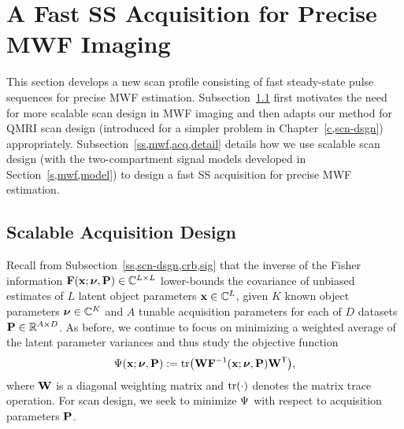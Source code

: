 \section{A Fast SS Acquisition for Precise MWF Imaging}
\label{s,mwf,acq}

This section develops a new scan profile
consisting of fast steady-state pulse sequences
for precise MWF estimation.
Subsection~\ref{ss,mwf,acq,design} 
first motivates the need
for more scalable scan design
in MWF imaging 
and then adapts our method 
for QMRI scan design
(introduced for a simpler problem 
in Chapter~\ref{c,scn-dsgn}) 
appropriately.
Subsection~\ref{ss,mwf,acq,detail}
details how we use scalable scan design
(with the two-compartment signal models developed 
in Section~\ref{s,mwf,model})
to design a fast SS acquisition 
for precise MWF estimation.

\subsection{Scalable Acquisition Design}
\label{ss,mwf,acq,design}

Recall from Subsection~\ref{ss,scn-dsgn,crb,sig} 
that the inverse 
of the Fisher information 
$\Fisher{\bmx;\bmnu,\bmP} \in \complexes{L \times L}$ 
lower-bounds the covariance
of unbiased estimates 
of $L$ latent object parameters $\mathbf{x} \in \mathbb{C}^{L}$,
given $K$ known object parameters $\boldsymbol{\nu} \in \mathbb{C}^{K}$ 
and $A$ tunable acquisition parameters 
for each of $D$ datasets 
$\mathbf{P} \in \mathbb{R}^{A \times D}$.
As before, we continue to focus 
on minimizing a weighted average 
of the latent parameter variances
and thus study the objective function
\begin{align}
	\costa{\bmx; \bmnu, \bmP} := 
		\trace{\bmW \bmF^{-1}\paren{\bmx;\bmnu,\bmP} \bmW\tpose},
	\label{eq:mwf,cost}
\end{align}
where $\mathbf{W}$ is a diagonal weighting matrix
and $\trace{\cdot}$ denotes the matrix trace operation.
For scan design,
we seek to minimize $\Psi$
with respect to acquisition parameters $\mathbf{P}$.


